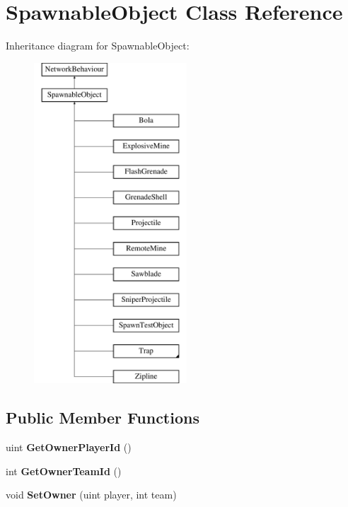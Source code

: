 \hypertarget{class_spawnable_object}{}\section{Spawnable\+Object Class Reference}
\label{class_spawnable_object}
Inheritance diagram for Spawnable\+Object\+:\begin{figure}[H]
\begin{center}
\leavevmode
\includegraphics[height=12.000000cm]{class_spawnable_object}
\end{center}
\end{figure}
\subsection*{Public Member Functions}
\begin{DoxyCompactItemize}
\item 
\hypertarget{class_spawnable_object_a82f01267a159ad2890fac167d9012cec}{}\label{class_spawnable_object_a82f01267a159ad2890fac167d9012cec} 
uint {\bfseries Get\+Owner\+Player\+Id} ()
\item 
\hypertarget{class_spawnable_object_a9104a7e7850451b58beb045544cd2a38}{}\label{class_spawnable_object_a9104a7e7850451b58beb045544cd2a38} 
int {\bfseries Get\+Owner\+Team\+Id} ()
\item 
\hypertarget{class_spawnable_object_a8cb42984aa785fa07a2d781df0e151d3}{}\label{class_spawnable_object_a8cb42984aa785fa07a2d781df0e151d3} 
void {\bfseries Set\+Owner} (uint player, int team)
\end{DoxyCompactItemize}
